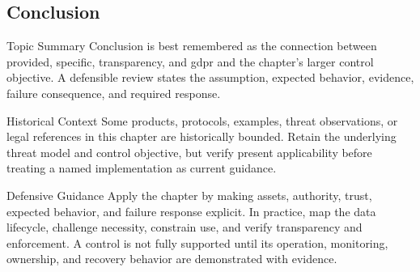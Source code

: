 \documentclass[11pt,letterpaper]{article}
\begin{document}
\subsection*{Conclusion}
\begin{CornellNotesTable}
\end{CornellNotesTable}
\begin{CornellSummaryBox}{Topic Summary}
Conclusion is best remembered as the connection between provided, specific, transparency, and gdpr and the chapter's larger control objective. A defensible review states the assumption, expected behavior, evidence, failure consequence, and required response.
\end{CornellSummaryBox}
\begin{CornellWarningBox}{Historical Context}
Some products, protocols, examples, threat observations, or legal references in this chapter are historically bounded. Retain the underlying threat model and control objective, but verify present applicability before treating a named implementation as current guidance.
\end{CornellWarningBox}
\begin{CornellOverviewBox}{Defensive Guidance}
Apply the chapter by making assets, authority, trust, expected behavior, and failure response explicit. In practice, map the data lifecycle, challenge necessity, constrain use, and verify transparency and enforcement. A control is not fully supported until its operation, monitoring, ownership, and recovery behavior are demonstrated with evidence.
\end{CornellOverviewBox}
\end{document}
